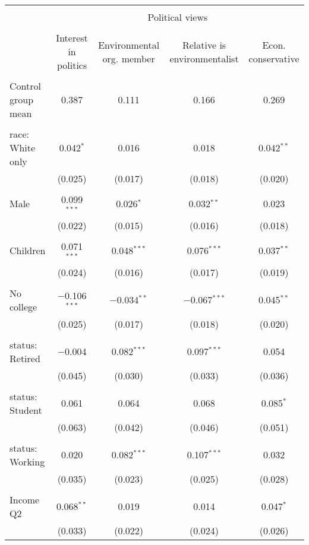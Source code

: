 
\begin{tabular}{@{\extracolsep{5pt}}lcccc} 
\\[-1.8ex]\hline 
\hline \\[-1.8ex] 
 & \multicolumn{4}{c}{Political views} \\ 
\cline{2-5} 
\\[-1.8ex] & Interest in politics & Environmental org. member & Relative is environmentalist & Econ. conservative \\ 
\hline \\[-1.8ex] 
 Control group mean & 0.387 & 0.111 & 0.166 & 0.269  \\ \hline \\[-1.8ex] race: White only & 0.042$^{*}$ & 0.016 & 0.018 & 0.042$^{**}$ \\ 
  & (0.025) & (0.017) & (0.018) & (0.020) \\ 
  & & & & \\ 
 Male & 0.099$^{***}$ & 0.026$^{*}$ & 0.032$^{**}$ & 0.023 \\ 
  & (0.022) & (0.015) & (0.016) & (0.018) \\ 
  & & & & \\ 
 Children & 0.071$^{***}$ & 0.048$^{***}$ & 0.076$^{***}$ & 0.037$^{**}$ \\ 
  & (0.024) & (0.016) & (0.017) & (0.019) \\ 
  & & & & \\ 
 No college & $-$0.106$^{***}$ & $-$0.034$^{**}$ & $-$0.067$^{***}$ & 0.045$^{**}$ \\ 
  & (0.025) & (0.017) & (0.018) & (0.020) \\ 
  & & & & \\ 
 status: Retired & $-$0.004 & 0.082$^{***}$ & 0.097$^{***}$ & 0.054 \\ 
  & (0.045) & (0.030) & (0.033) & (0.036) \\ 
  & & & & \\ 
 status: Student & 0.061 & 0.064 & 0.068 & 0.085$^{*}$ \\ 
  & (0.063) & (0.042) & (0.046) & (0.051) \\ 
  & & & & \\ 
 status: Working & 0.020 & 0.082$^{***}$ & 0.107$^{***}$ & 0.032 \\ 
  & (0.035) & (0.023) & (0.025) & (0.028) \\ 
  & & & & \\ 
 Income Q2 & 0.068$^{**}$ & 0.019 & 0.014 & 0.047$^{*}$ \\ 
  & (0.033) & (0.022) & (0.024) & (0.026) \\ 

\end{tabular}
